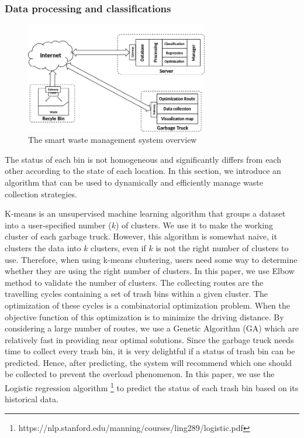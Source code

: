 \documentclass[conference,compsoc]{IEEEtran}
\begin{document}
\subsubsection{Data processing and classifications}
\begin{figure}
	\centering
	\includegraphics[width=8cm]{Model1-2}
	\caption{The smart waste management system overview}
	\label{fig2}
\end{figure}

The status of each bin is not homogeneous and significantly differs from each other according to the state of each location. In this section, we introduce an algorithm that can be used to dynamically and efficiently manage waste collection strategies.

\par K-means \cite{Kanungo2003} is an unsupervised machine learning algorithm that groups a dataset into a user-specified number ($k$) of clusters. We use it to make the working cluster of each garbage truck. However, this algorithm is somewhat naive, it clusters the data into $k$ clusters, even if $k$ is not the right number of clusters to use. Therefore, when using k-means clustering, users need some way to determine whether they are using the right number of clusters. In this paper, we use Elbow method \cite{Kodinariya2013} to validate the number of clusters. The collecting routes are the travelling cycles containing a set of trash bins within a given cluster. The optimization of these cycles is a combinatorial optimization problem. When the objective function of this optimization is to minimize the driving distance. By considering a large number of routes, we use a Genetic Algorithm (GA) \cite{Gutierrez2008} which are relatively fast in providing near optimal solutions. Since the garbage truck needs time to collect every trash bin, it is very delightful if a status of trash bin can be predicted. Hence, after predicting, the system will recommend which one should be collected to prevent the overload phenomenon. In this paper, we use the Logistic regression algorithm \footnote{https://nlp.stanford.edu/manning/courses/ling289/logistic.pdf} to predict the status of each trash bin based on its historical data.
\end{document}
